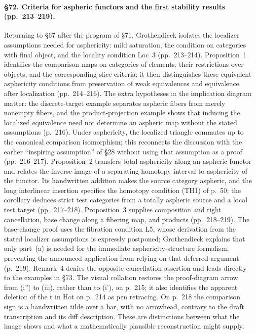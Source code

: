 \paragraph{\S72. Criteria for aspheric functors and the first stability results (pp.\ 213--219).}
Returning to \S67 after the program of \S71, Grothendieck isolates the localizer assumptions needed for asphericity: mild saturation, the condition on categories with final object, and the locality condition Loc~3 (pp.\ 213--214). Proposition~1 identifies the comparison maps on categories of elements, their restrictions over objects, and the corresponding slice criteria; it then distinguishes these equivalent asphericity conditions from preservation of weak equivalences and equivalence after localization (pp.\ 214--216). The extra hypotheses in the implication diagram matter: the discrete-target example separates aspheric fibers from merely nonempty fibers, and the product-projection example shows that inducing the localized equivalence need not determine an aspheric map without the stated assumptions (p.\ 216). Under asphericity, the localized triangle commutes up to the canonical comparison isomorphism; this reconnects the discussion with the earlier ``inspiring assumption'' of \S28 without using that assumption as a proof (pp.\ 216--217). Proposition~2 transfers total asphericity along an aspheric functor and relates the inverse image of a separating homotopy interval to asphericity of the functor. Its handwritten addition makes the source category aspheric, and the long interlinear insertion specifies the homotopy condition (TH1) of p.\ 50; the corollary deduces strict test categories from a totally aspheric source and a local test target (pp.\ 217--218). Proposition~3 supplies composition and right cancellation, base change along a fibering map, and products (pp.\ 218--219). The base-change proof uses the fibration condition L5, whose derivation from the stated localizer assumptions is expressly postponed; Grothendieck explains that only part~(a) is needed for the immediate asphericity-structure formalism, preventing the announced application from relying on that deferred argument (p.\ 219). Remark~4 denies the opposite cancellation assertion and leads directly to the examples in \S73. The visual collation restores the proof-diagram arrow from (i'') to (iii), rather than to (i'), on p.\ 215; it also identifies the apparent deletion of the t in Hot on p.\ 214 as pen retracing. On p.\ 218 the comparison sign is a handwritten tilde over a bar, with no arrowhead, contrary to the draft transcription and its diff description. These are distinctions between what the image shows and what a mathematically plausible reconstruction might supply.

